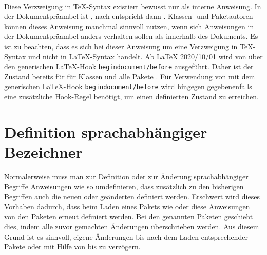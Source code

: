 \begin{Declaration}[0]
  \ \ %
  \  
\end{Declaration}
Diese Verzweigung in \TeX-Syntax existiert bewusst nur als interne
Anweisung. In der Dokumentpräambel ist  ,
nach  entspricht  dann
.  Klassen- und Paketautoren können dieses Anweisung manchmal
sinnvoll nutzen, wenn sich Anweisungen in der Dokumentpräambel anders
verhalten sollen als innerhalb des Dokuments. Es ist zu
beachten, dass es sich bei dieser Anweisung um eine Verzweigung in \TeX-Syntax
und nicht in \LaTeX-Syntax handelt. Ab
\LaTeX{} 2020/10/01 wird  von  über
den generischen \LaTeX-Hook \texttt{begindocument/before} ausgeführt. Daher
ist der Zustand bereits für  für Klassen und alle Pakete
. Für Verwendung von  mit dem generischen
\LaTeX-Hook \texttt{begindocument/before} wird hingegen gegebenenfalls eine
zusätzliche Hook-Regel benötigt, um einen definierten Zustand zu erreichen.%
\EndIndexGroup


\section{Definition sprachabhängiger Bezeichner}
\BeginIndexGroup
{}

Normalerweise muss man zur Definition oder zur Änderung sprachabhängiger
Begriffe Anweisungen wie  so umdefinieren, dass
zusätzlich zu den bisherigen Begriffen auch die neuen oder geänderten
definiert werden. Erschwert wird dieses Vorhaben dadurch, dass beim Laden
eines Pakets wie  oder
 diese Anweisungen von den
Paketen erneut definiert werden. Bei den genannten Paketen geschieht dies,
indem alle zuvor gemachten Änderungen überschrieben werden. Aus diesem Grund
ist es sinnvoll, eigene Änderungen bis nach dem Laden entsprechender Pakete
oder mit Hilfe von  bis
 zu verzögern.

